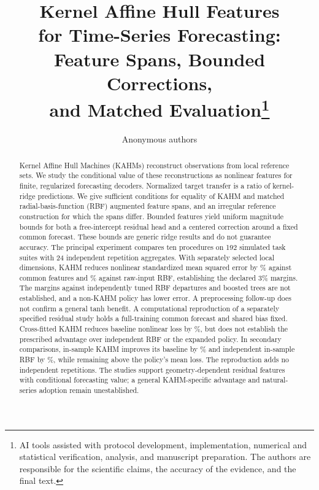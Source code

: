 \documentclass[10pt]{article}
\title{Kernel Affine Hull Features\\
for Time-Series Forecasting:\\
Feature Spans, Bounded Corrections,\\
and Matched Evaluation\thanks{AI tools assisted with protocol development, implementation, numerical and statistical verification, analysis, and manuscript preparation. The authors are responsible for the scientific claims, the accuracy of the evidence, and the final text.}}
\author{Anonymous authors}
\begin{document}
\maketitle
\begin{abstract}
Kernel Affine Hull Machines (KAHMs) reconstruct observations from local
reference sets. We study the conditional value of these reconstructions
as nonlinear features for finite, regularized forecasting decoders.
Normalized target transfer is a ratio of kernel-ridge predictions.
We give sufficient conditions for equality of KAHM and matched
radial-basis-function (RBF) augmented feature spans, and an irregular
reference construction for which the spans differ. Bounded features
yield uniform magnitude bounds for both a free-intercept residual head
and a centered correction around a fixed common forecast. These bounds
are generic ridge results and do not guarantee accuracy.
The principal experiment compares ten procedures on 192 simulated task
suites with 24 independent repetition aggregates. With separately
selected local dimensions, KAHM reduces nonlinear standardized mean
squared error by \DFGainCommon\% against common features and
\DFGainRawRBF\% against raw-input RBF, establishing the declared 3\%
margins. The margins against independently tuned RBF departures and
boosted trees are not established, and a non-KAHM policy has lower error.
A preprocessing follow-up does not confirm a general tanh benefit.
A computational reproduction of a separately specified residual study
holds a full-training common forecast and shared bias fixed.
Cross-fitted KAHM reduces baseline nonlinear loss by \CFRGainBias\%, but does not
establish the prescribed advantage over independent RBF or the expanded
policy. In secondary comparisons, in-sample KAHM improves its baseline
by \CFRISGainBias\% and independent in-sample RBF by \CFRISGainRBF\%,
while remaining above the policy's mean loss. The reproduction adds no
independent repetitions. The studies support geometry-dependent residual
features with conditional forecasting value; a general KAHM-specific
advantage and natural-series adoption remain unestablished.
\end{abstract}













\appendix
\FloatBarrier

\FloatBarrier

\end{document}
